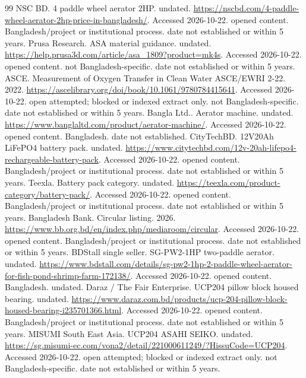 \documentclass[11pt,a4paper]{article}
\begin{document}
\clearpage\begin{thebibliography}{99}
 NSC BD. 4 paddle wheel aerator 2HP. undated. \url{https://nscbd.com/4-paddle-wheel-aerator-2hp-price-in-bangladesh/}. Accessed 2026-10-22. opened content. Bangladesh/project or institutional process. date not established or within 5 years.
 Prusa Research. ASA material guidance. undated. \url{https://help.prusa3d.com/article/asa_1809?product=mk4s}. Accessed 2026-10-22. opened content. not Bangladesh-specific. date not established or within 5 years.
 ASCE. Measurement of Oxygen Transfer in Clean Water ASCE/EWRI 2-22. 2022. \url{https://ascelibrary.org/doi/book/10.1061/9780784415641}. Accessed 2026-10-22. open attempted; blocked or indexed extract only. not Bangladesh-specific. date not established or within 5 years.
 Bangla Ltd.. Aerator machine. undated. \url{https://www.banglaltd.com/product/aerator-machine/}. Accessed 2026-10-22. opened content. Bangladesh. date not established.
 CityTechBD. 12V20Ah LiFePO4 battery pack. undated. \url{https://www.citytechbd.com/12v-20ah-lifepo4-rechargeable-battery-pack}. Accessed 2026-10-22. opened content. Bangladesh/project or institutional process. date not established or within 5 years.
 Teexla. Battery pack category. undated. \url{https://teexla.com/product-category/battery-pack/}. Accessed 2026-10-22. opened content. Bangladesh/project or institutional process. date not established or within 5 years.
 Bangladesh Bank. Circular listing. 2026. \url{https://www.bb.org.bd/en/index.php/mediaroom/circular}. Accessed 2026-10-22. opened content. Bangladesh/project or institutional process. date not established or within 5 years.
 BDStall single seller. SG-PW2-1HP two-paddle aerator. undated. \url{https://www.bdstall.com/details/sg-pw2-1hp-2-paddle-wheel-aerator-for-fish-pond-shrimp-farm-172138/}. Accessed 2026-10-22. opened content. Bangladesh. undated.
 Daraz / The Fair Enterprise. UCP204 pillow block housed bearing. undated. \url{https://www.daraz.com.bd/products/ucp-204-pillow-block-housed-bearing-i235701366.html}. Accessed 2026-10-22. opened content. Bangladesh/project or institutional process. date not established or within 5 years.
 MISUMI South East Asia. UCP204 ASAHI SEIKO. undated. \url{https://sg.misumi-ec.com/vona2/detail/221000611249/?HissuCode=UCP204}. Accessed 2026-10-22. open attempted; blocked or indexed extract only. not Bangladesh-specific. date not established or within 5 years.

\end{thebibliography}
\end{document}
